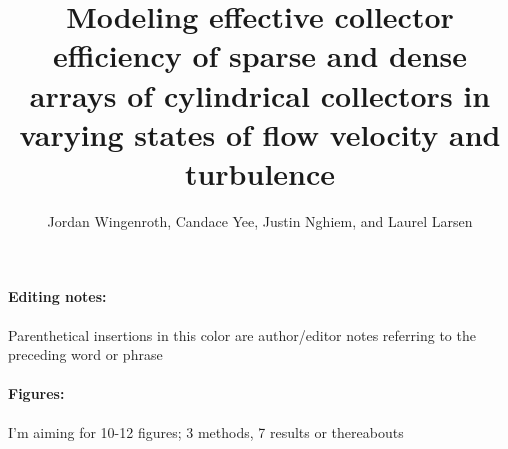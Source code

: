 \documentclass[10pt,a4paper]{article}
\author{Jordan Wingenroth, Candace Yee, Justin Nghiem, and Laurel Larsen}
\title{Modeling effective collector efficiency of sparse and dense arrays of cylindrical collectors in varying states of flow velocity and turbulence}
\begin{document}
\maketitle



\paragraph{Editing notes:} 

\textcolor{green!50!red}{Parenthetical insertions in this color are author/editor notes referring to the preceding word or phrase}



\paragraph{Figures:}

I'm aiming for 10-12 figures; 3 methods, 7 results or thereabouts
\end{document}
